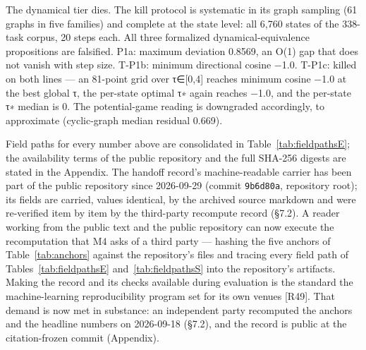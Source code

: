 \documentclass[11pt,a4paper]{article}
\begin{document}
The dynamical tier dies. The kill protocol is systematic in its graph sampling (61 graphs in five families) and complete at the state level: all 6,760 states of the 338-task corpus, 20 steps each. All three formalized dynamical-equivalence propositions are falsified. P1a: maximum deviation 0.8569, an O(1) gap that does not vanish with step size. T-P1b: minimum directional cosine −1.0. T-P1c: killed on both lines — an 81-point grid over τ∈[0,4] reaches minimum cosine −1.0 at the best global τ, the per-state optimal τ∗ again reaches −1.0, and the per-state τ∗ median is 0. The potential-game reading is downgraded accordingly, to approximate (cyclic-graph median residual 0.669).

Field paths for every number above are consolidated in Table~\ref{tab:fieldpathsE}; the availability terms of the public repository and the full SHA-256 digests are stated in the Appendix. The handoff record's machine-readable carrier has been part of the public repository since 2026-09-29 (commit \texttt{9b6d80a}, repository root); its fields are carried, values identical, by the archived source markdown and were re-verified item by item by the third-party recompute record (§7.2). A reader working from the public text and the public repository can now execute the recomputation that M4 asks of a third party — hashing the five anchors of Table~\ref{tab:anchors} against the repository's files and tracing every field path of Tables~\ref{tab:fieldpathsE} and~\ref{tab:fieldpathsS} into the repository's artifacts. Making the record and its checks available during evaluation is the standard the machine-learning reproducibility program set for its own venues [R49]. That demand is now met in substance: an independent party recomputed the anchors and the headline numbers on 2026-09-18 (§7.2), and the record is public at the citation-frozen commit (Appendix).
\end{document}
